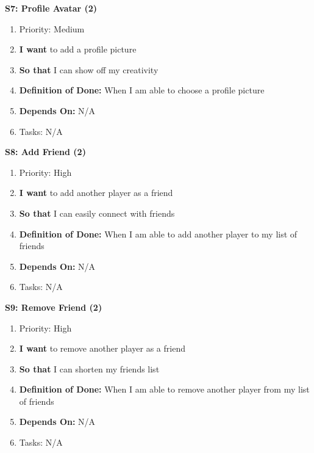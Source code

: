 \textbf{S7: Profile Avatar (2)}
\begin{enumerate}
    \item Priority: Medium
    \item \textbf{I want} to add a profile picture
    \item \textbf{So that} I can show off my creativity
    \item \textbf{Definition of Done:} When I am able to choose a profile picture
    \item \textbf{Depends On:} N/A
    \item Tasks: N/A
\end{enumerate}


\textbf{S8: Add Friend (2)}
\begin{enumerate}
    \item Priority: High
    \item \textbf{I want} to add another player as a friend
    \item \textbf{So that} I can easily connect with friends
    \item \textbf{Definition of Done:} When I am able to add another player to my list of friends
    \item \textbf{Depends On:} N/A
    \item Tasks: N/A
\end{enumerate}


\textbf{S9: Remove Friend (2)}
\begin{enumerate}
    \item Priority: High
    \item \textbf{I want} to remove another player as a friend
    \item \textbf{So that} I can shorten my friends list
    \item \textbf{Definition of Done:} When I am able to remove another player from my list of friends
    \item \textbf{Depends On:} N/A
    \item Tasks: N/A
\end{enumerate}


